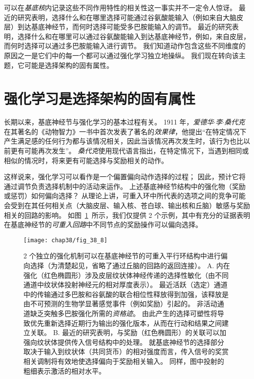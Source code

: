 可以在\textit{基底核}内记录这些不同作用特性的相关性这一事实并不一定令人惊讶。
最近的研究表明，选择什么和在哪里选择可能通过谷氨酸能输入（例如来自大脑皮层）到达基底神经节，而何时选择可能受多巴胺能输入的调节。
最近的研究表明，选择什么和在哪里可以通过谷氨酸能输入到达基底神经节，例如，来自皮层，而何时选择可以通过多巴胺能输入进行调节。
我们知道动作包含这些不同维度的原因之一是它们中的每一个都可以通过强化学习独立地操纵。
我们现在转向该主题，它可能是选择架构的固有属性。



\section{强化学习是选择架构的固有属性} \label{sec:38_7}

长期以来，基底神经节与强化学习的基本过程有关。
1911 年，\textit{爱德华$\cdot$李$\cdot$桑代克}在其著名的《动物智力》一书中首次发表了著名的\textit{效果律}，他提出“在特定情况下产生满足感的任何行为都与该情况相关，因此当该情况再次发生时，该行为也比以前更有可能再次发生”。
\textit{桑代克}使用现代语言指出，在特定情况下，当遇到相同或相似的情况时，将来更有可能选择与奖励相关的动作。


这样说来，强化学习可以看作是一个偏置偏向动作选择的过程；
因此，预计它将通过调节负责选择机制中的活动来运作。
上述基底神经节结构中的强化物（奖励或惩罚）如何偏向选择？
从理论上讲，可重入环中所代表的选项之间的竞争可能会受到在其任何相关点（大脑皮层、输入核、苍白球、输出核和丘脑）敏感与奖励相关的回路的影响。
如图~\ref{fig:38_8}~所示，我们仅提供 2 个示例，其中有充分的证据表明在基底神经节的\textit{可重入回路}中不同节点的奖励操作可以偏向选择。


\begin{figure}[htbp]
	\centering
	\texttt{[image: chap38/fig\_38\_8]}
	\caption{2 个独立的强化机制可以在基底神经节的可重入平行环结构中进行偏向选择（为清楚起见，省略了通过丘脑的回路的返回连接）。
		A. 内在强化（红色椭圆形）涉及皮层纹状体神经传递的选择性敏化（由不同通道中纹状体投射神经元的相对厚度表示）。
		最近活跃（选定）通道中的传输通过多巴胺和谷氨酸的联合相位性释放得到加强，该释放是由不可预测的生物学显著感觉事件（例如奖励）引起的。
		非活动通道缺乏突触多巴胺强化所需的\textit{资格迹}。
		由此产生的选择可塑性将导致优先重新选择近期行为输出的强化版本，从而在行动和结果之间建立关联。
		B. 最近的研究表明，与奖励（红色椭圆形）的关联可以加强向纹状体提供传入信号结构中的处理。
		就基底神经节的选择部分取决于输入到纹状体（共同货币）的相对强度而言，传入信号的奖赏相关调制将有效地使选择偏向于奖励相关输入。
		同样，图中投射的粗细表示激活的相对水平。}
	\label{fig:38_8}
\end{figure}



